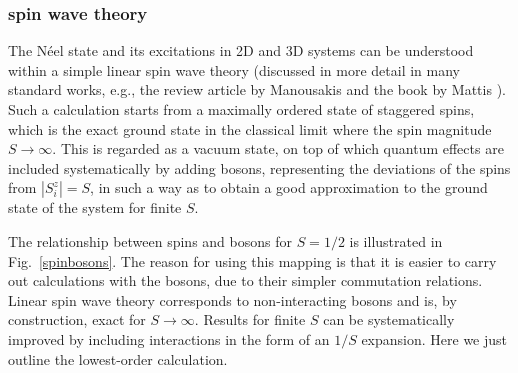 \documentclass[draft,numberedheadings]{aipproc}
\begin{document}
\subsubsection{spin wave theory}
\label{spinwave}

The N\'eel state and its excitations in 2D and 3D systems can be understood within a simple linear spin wave theory (discussed in more detail in many 
standard works, e.g., the review article by Manousakis \cite{manousakis} and the book by Mattis \cite{mattis}). Such a calculation starts from a maximally 
ordered state of staggered spins, which is the exact ground state in the classical limit where the spin magnitude $S \to \infty$. This is regarded as a vacuum 
state, on top of which quantum effects are included systematically by adding bosons, representing the deviations of the spins from $|S^z_i|=S$, in such a 
way as to obtain a good approximation to the ground state of the system for finite $S$.

The relationship between spins and bosons for $S=1/2$ is illustrated in Fig.~\ref{spinbosons}. The reason for using this 
mapping is that it is easier to carry out calculations with the bosons, due to their simpler commutation relations. Linear spin wave theory corresponds 
to non-interacting bosons and is, by construction, exact for $S\to \infty$. Results for finite $S$ can be systematically improved by including 
interactions in the form of an $1/S$ expansion. Here we just outline the lowest-order calculation.
\end{document}
